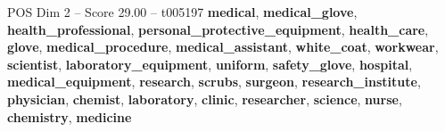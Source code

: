 \begin{textsample}{POS Dim 2 – Score 29.00 – t005197}  \label{ex:f2_pos_018}
\textbf{medical}, \textbf{medical\_glove}, \textbf{health\_professional}, \textbf{personal\_protective\_equipment}, \textbf{health\_care}, \textbf{glove}, \textbf{medical\_procedure}, \textbf{medical\_assistant}, \textbf{white\_coat}, \textbf{workwear}, \textbf{scientist}, \textbf{laboratory\_equipment}, \textbf{uniform}, \textbf{safety\_glove}, \textbf{hospital}, \textbf{medical\_equipment}, \textbf{research}, \textbf{scrubs}, \textbf{surgeon}, \textbf{research\_institute}, \textbf{physician}, \textbf{chemist}, \textbf{laboratory}, \textbf{clinic}, \textbf{researcher}, \textbf{science}, \textbf{nurse}, \textbf{chemistry}, \textbf{medicine}

\end{textsample}

